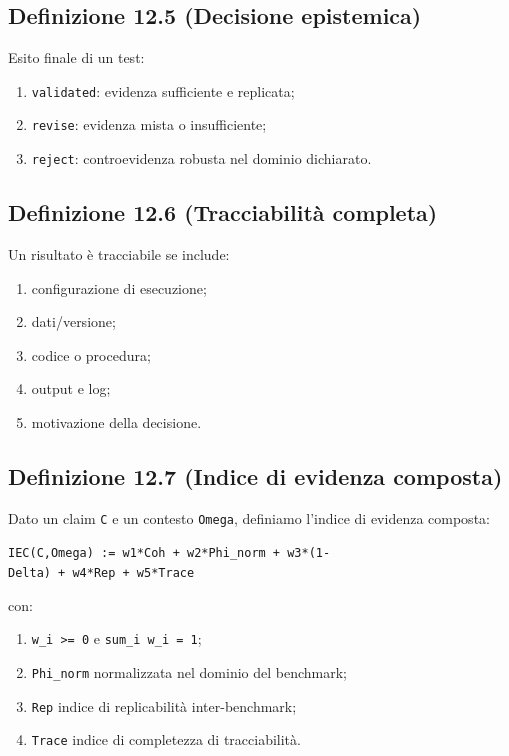 \subsection{Definizione 12.5 (Decisione epistemica)}

Esito finale di un test:

\begin{enumerate}
\def\labelenumi{\arabic{enumi}.}
\tightlist
\item
  \texttt{validated}: evidenza sufficiente e replicata;
\item
  \texttt{revise}: evidenza mista o insufficiente;
\item
  \texttt{reject}: controevidenza robusta nel dominio dichiarato.
\end{enumerate}

\subsection{Definizione 12.6 (Tracciabilità completa)}

Un risultato è tracciabile se include:

\begin{enumerate}
\def\labelenumi{\arabic{enumi}.}
\tightlist
\item
  configurazione di esecuzione;
\item
  dati/versione;
\item
  codice o procedura;
\item
  output e log;
\item
  motivazione della decisione.
\end{enumerate}

\subsection{Definizione 12.7 (Indice di evidenza composta)}

Dato un claim \texttt{C} e un contesto \texttt{Omega}, definiamo l'indice di evidenza composta:

\texttt{IEC(C,Omega)\ :=\ w1*Coh\ +\ w2*Phi\_norm\ +\ w3*(1-Delta)\ +\ w4*Rep\ +\ w5*Trace}

con:

\begin{enumerate}
\def\labelenumi{\arabic{enumi}.}
\tightlist
\item
  \texttt{w\_i\ \textgreater{}=\ 0} e \texttt{sum\_i\ w\_i\ =\ 1};
\item
  \texttt{Phi\_norm} normalizzata nel dominio del benchmark;
\item
  \texttt{Rep} indice di replicabilità inter-benchmark;
\item
  \texttt{Trace} indice di completezza di tracciabilità.
\end{enumerate}

